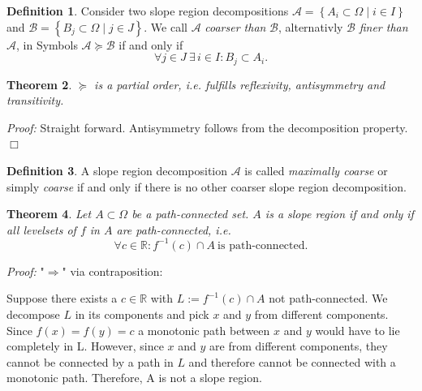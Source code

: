 \documentclass[a4paper,12pt,notitlepage,fullpage]{paper}
\theoremstyle{plain}
\newtheorem{thm}{Theorem}[section] %
\theoremstyle{definition}
\newtheorem{defn}[thm]{Definition} %
\begin{document}


\begin{defn}
Consider two slope region decompositions $\mathcal{A} = \left\{ A_i \subset \Omega \mid i \in I \right\}$ and $\mathcal{B} = \left\{ B_j \subset \Omega \mid j \in J \right\}$. We call $\mathcal{A}$ \emph{coarser than} $\mathcal{B}$, alternativly $\mathcal{B}$ \emph{finer than} $\mathcal{A}$, in Symbols $\mathcal{A} \succeq \mathcal{B}$ if and only if
\begin{equation*}
\forall j \in J ~ \exists \, i \in I: B_j \subset A_i.
\end{equation*}
\end{defn}

\begin{thm}
$\succeq$ is a partial order, i.e. fulfills reflexivity, antisymmetry and transitivity.
\end{thm}
\emph{Proof:} Straight forward. Antisymmetry follows from the decomposition property. \hfill $\Box$

\begin{defn}
A slope region decomposition $\mathcal{A}$ is called \emph{maximally coarse} or simply \emph{coarse} if and only if there is no other coarser slope region decomposition.
\end{defn}

\begin{thm}
\label{slope_iff_conn_lvlsets}
Let $A \subset \Omega$ be a path-connected set. $A$ is a slope region if and only if all levelsets of $f$ in $A$ are path-connected, i.e.
\begin{equation*}
\forall c \in \mathbb{R}: f^{-1}(c) \cap A ~ \text{is path-connected}.
\end{equation*}
\end{thm}

\emph{Proof:} "$\Rightarrow$" via contraposition:

Suppose there exists a $c \in \mathbb{R}$ with $L := f^{-1}(c) \cap A$ not path-connected. We decompose $L$ in its components and pick $x$ and $y$ from different components. Since $f(x) = f(y) = c$ a monotonic path between $x$ and $y$ would have to lie completely in L. However, since $x$ and $y$ are from different components, they cannot be connected by a path in $L$ and therefore cannot be connected with a monotonic path. Therefore, A is not a slope region.
\end{document}

